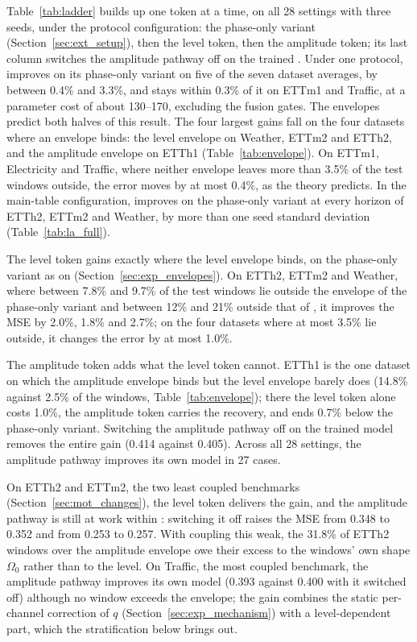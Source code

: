 {Table~\ref{tab:ladder} builds \sysplus up one token at a time, on all 28 settings with three seeds, under the protocol configuration: the phase-only variant (Section~\ref{sec:ext_setup}), then the level token, then the amplitude token; its last column switches the amplitude pathway off on the trained \sysplus. Under one protocol, \sysplus improves on its phase-only variant on five of the seven dataset averages, by between 0.4\% and 3.3\%, and stays within 0.3\% of it on ETTm1 and Traffic, at a parameter cost of about 130--170, excluding the fusion gates. The envelopes predict both halves of this result. The four largest gains fall on the four datasets where an envelope binds: the level envelope on Weather, ETTm2 and ETTh2, and the amplitude envelope on ETTh1 (Table~\ref{tab:envelope}). On ETTm1, Electricity and Traffic, where neither envelope leaves more than 3.5\% of the test windows outside, the error moves by at most 0.4\%, as the theory predicts. In the main-table configuration, \sysplus improves on the phase-only variant at every horizon of ETTh2, ETTm2 and Weather, by more than one seed standard deviation (Table~\ref{tab:la_full}).

The level token gains exactly where the level envelope binds, on the phase-only variant as on \sysplus (Section~\ref{sec:exp_envelopes}). On ETTh2, ETTm2 and Weather, where between 7.8\% and 9.7\% of the test windows lie outside the envelope of the phase-only variant and between 12\% and 21\% outside that of \sysplus, it improves the MSE by 2.0\%, 1.8\% and 2.7\%; on the four datasets where at most 3.5\% lie outside, it changes the error by at most 1.0\%.

The amplitude token adds what the level token cannot. ETTh1 is the one dataset on which the amplitude envelope binds but the level envelope barely does (14.8\% against 2.5\% of the windows, Table~\ref{tab:envelope}); there the level token alone costs 1.0\%, the amplitude token carries the recovery, and \sysplus ends 0.7\% below the phase-only variant. Switching the amplitude pathway off on the trained model removes the entire gain (0.414 against 0.405). Across all 28 settings, the amplitude pathway improves its own model in 27 cases.

On ETTh2 and ETTm2, the two least coupled benchmarks (Section~\ref{sec:mot_changes}), the level token delivers the gain, and the amplitude pathway is still at work within \sysplus: switching it off raises the MSE from 0.348 to 0.352 and from 0.253 to 0.257. With coupling this weak, the 31.8\% of ETTh2 windows over the amplitude envelope owe their excess to the windows' own shape $\Omega_0$ rather than to the level. On Traffic, the most coupled benchmark, the amplitude pathway improves its own model (0.393 against 0.400 with it switched off) although no window exceeds the envelope; the gain combines the static per-channel correction of $q$ (Section~\ref{sec:exp_mechanism}) with a level-dependent part, which the stratification below brings out.

}
